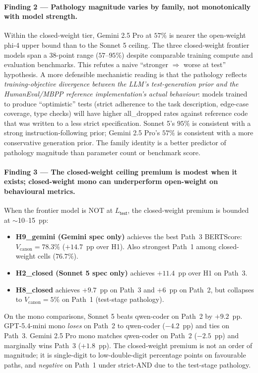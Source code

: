 \paragraph{Finding 2 --- Pathology magnitude varies by family, not monotonically with model strength.}
Within the closed-weight tier, Gemini 2.5 Pro at $57\%$ is nearer the open-weight phi-4 upper bound than to the Sonnet 5 ceiling. The three closed-weight frontier models span a $38$-point range ($57$--$95\%$) despite comparable training compute and evaluation benchmarks. This refutes a naive ``stronger $\Rightarrow$ worse at test'' hypothesis. A more defensible mechanistic reading is that the pathology reflects \emph{training-objective divergence between the LLM's test-generation prior and the HumanEval/MBPP reference implementation's actual behaviour}: models trained to produce ``optimistic'' tests (strict adherence to the task description, edge-case coverage, type checks) will have higher \textsf{all\_dropped} rates against reference code that was written to a less strict specification. Sonnet 5's $95\%$ is consistent with a strong instruction-following prior; Gemini 2.5 Pro's $57\%$ is consistent with a more conservative generation prior. The family identity is a better predictor of pathology magnitude than parameter count or benchmark score.

\paragraph{Finding 3 --- The closed-weight ceiling premium is modest when it exists; closed-weight mono can underperform open-weight on behavioural metrics.}
When the frontier model is NOT at $L_{\textsf{test}}$, the closed-weight premium is bounded at $\sim$10--15~pp:

\begin{itemize}
  \item \textbf{H9\_gemini (Gemini spec only)} achieves the best Path~3 BERTScore: $V_{\text{canon}} = 78.3\%$ ($+14.7$~pp over H1). Also strongest Path~1 among closed-weight cells ($76.7\%$).
  \item \textbf{H2\_closed (Sonnet 5 spec only)} achieves $+11.4$~pp over H1 on Path~3.
  \item \textbf{H8\_closed} achieves $+9.7$~pp on Path~3 and $+6$~pp on Path~2, but collapses to $V_{\text{canon}} = 5\%$ on Path~1 (test-stage pathology).
\end{itemize}

On the mono comparisons, Sonnet 5 beats qwen-coder on Path~2 by $+9.2$~pp. GPT-5.4-mini mono \emph{loses} on Path~2 to qwen-coder ($-4.2$~pp) and ties on Path~3. Gemini 2.5 Pro mono matches qwen-coder on Path~2 ($-2.5$~pp) and marginally wins Path~3 ($+1.8$~pp). The closed-weight premium is not an order of magnitude; it is single-digit to low-double-digit percentage points on favourable paths, and \emph{negative} on Path~1 under strict-AND due to the test-stage pathology.


